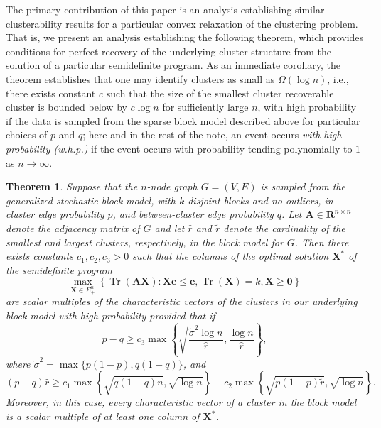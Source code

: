 \documentclass[twoside,11pt]{article}
\newtheorem{theorem}{Theorem}[section]
\newcommand{\R}{\mathbf{R}}
\DeclareMathOperator{\tr}{{Tr}}
\newcommand{\e}{\bs {e}}
\newcommand{\bs}{\boldsymbol}
\newcommand{\X}{\bs {X}}
\newcommand{\0}{\bs{0}}
\newcommand{\bra}[1]{\ensuremath{\left\{ #1 \right\}}} %
\newcommand{\ra}{\rightarrow}
\begin{document}
The primary contribution of this paper is an analysis establishing similar clusterability results for a particular
convex relaxation of the clustering problem.
That is, we present an analysis establishing the following theorem, which provides conditions for perfect recovery of the underlying cluster structure from
the solution of a particular semidefinite program.
As an immediate corollary, the theorem establishes that
one may identify clusters
as small as \( \Omega(\log n)\),
i.e.,  there exists constant $c$ such that the size of the smallest cluster recoverable cluster is bounded below by \(c \log n \) for sufficiently large \(n\),
with high probability
if the data is sampled from the sparse block model described above
for particular choices of $p$ and $q$;
here and in the rest of the note, an event occurs \emph{with high probability (w.h.p.)} if the event occurs with probability
tending polynomially to $1$ as $n \ra \infty$.

\begin{theorem} \label{thm: simple}
	Suppose that the \(n\)-node graph \(G = (V,E)\) is sampled from the generalized stochastic block model,
	with \(k\) disjoint blocks and no outliers, in-cluster edge probability \(p\), and between-cluster edge probability \(q\).
	Let \(\bs A \in \R^{n\times n}\) denote the adjacency matrix of \(G\)
	and let \(\hat r\) and \(\tilde r\) denote the cardinality of the smallest and largest clusters, respectively,
	in the block model for \(G\).
	Then there exists constants $c_1, c_2, c_3 > 0$ such that the columns of the optimal solution \(\X^*\) of
	the semidefinite program
	\begin{equation*} \label{eq: SDP}
	\max_{\X \in \Sigma_+^n} \bra{ \tr(\bs A \X) : \X \e \le \e, \tr(\X) = k, \X \ge \0 }
	\end{equation*}
	are scalar multiples of the characteristic vectors of the clusters in our underlying block model
	with high probability
	provided that
	if
	\[
		p - q \ge c_3 \max \bra{ \sqrt{\frac{\tilde \sigma^2 \log n}{\hat r}}, \frac{\log n}{\hat r} },
	\]
	where $\tilde \sigma^2 = \max\{{p(1-p)}, q(1-q) \}$, and
	\begin{equation*}
		(p-q) \hat r \ge c_1 \max \bra{ \sqrt{ q(1-q) n },\sqrt{ \log n}  }
		+ c_2 \max \bra{ \sqrt{p(1-p) \tilde r }, \sqrt{\log n} }.
	\end{equation*}
	Moreover, in this case, every characteristic vector of a cluster in the block model is a
	scalar multiple of at least one column of \(\X^*\).
\end{theorem}
\end{document}
